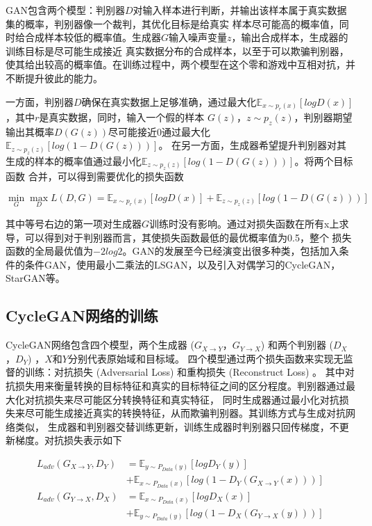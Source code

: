 GAN包含两个模型：判别器$D$对输入样本进行判断，并输出该样本属于真实数据集的概率，判别器像一个裁判，其优化目标是给真实
样本尽可能高的概率值，同时给合成样本较低的概率值。生成器$G$输入噪声变量$z$，输出合成样本，生成器的训练目标是尽可能生成接近
真实数据分布的合成样本，以至于可以欺骗判别器，使其给出较高的概率值。在训练过程中，两个模型在这个零和游戏中互相对抗，并不断提升彼此的能力。

一方面，判别器$D$确保在真实数据上足够准确，通过最大化$\mathbb{E}_{x\sim p_r(x)}\left[log D(x)\right]$，其中$r$是真实数据，同时，输入一个假的样本
$G(z)$，$z\sim p_z(z)$，判别器期望输出其概率$D(G(z))$尽可能接近$0$通过最大化$\mathbb{E}_{z\sim p_z(z)}\left[log(1-D(G(z)))\right]$。
在另一方面，生成器希望提升判别器对其生成的样本的概率值通过最小化$\mathbb{E}_{z\sim p_z(z)}\left[log(1-D(G(z)))\right]$。将两个目标函数
合并，可以得到需要优化的损失函数

\begin{equation}
    \min_G \max_D L(D,G)=\mathbb{E}_{x\sim p_r(x)}\left[log D(x)\right] + \mathbb{E}_{z\sim p_z(z)}\left[log(1-D(G(z)))\right]
\end{equation}

其中等号右边的第一项对生成器$G$训练时没有影响。通过对损失函数在所有x上求导，可以得到对于判别器而言，其使损失函数最低的最优概率值为0.5，整个
损失函数的全局最优值为$-2log2$。GAN的发展至今已经演变出很多种类，包括加入条件的条件GAN，使用最小二乘法的LSGAN，以及引入对偶学习的CycleGAN，StarGAN等。

\subsection{CycleGAN网络的训练}
CycleGAN网络包含四个模型，两个生成器 ($G_{X\rightarrow Y}$，$G_{Y\rightarrow X}$) 和两个判别器 ($D_X$，$D_Y$) ，$X$和$Y$分别代表原始域和目标域。
四个模型通过两个损失函数来实现无监督的训练：对抗损失 (Adversarial Loss) 和重构损失 (Reconstruct Loss) 。
其中对抗损失用来衡量转换的目标特征和真实的目标特征之间的区分程度。判别器通过最大化对抗损失来尽可能区分转换特征和真实特征，
同时生成器通过最小化对抗损失来尽可能生成接近真实的转换特征，从而欺骗判别器。其训练方式与生成对抗网络类似，
生成器和判别器交替训练更新，训练生成器时判别器只回传梯度，不更新梯度。对抗损失表示如下

\begin{align}
    L_{adv}(G_{X\rightarrow Y},D_Y) & =\mathbb{E}_{y\sim P_{Data}(y)}\left[log D_Y(y)\right] \\
    & + \mathbb{E}_{x\sim P_{Data}(x)}\left[log(1-D_Y(G_{X\rightarrow Y}(x)))\right] \\
    L_{adv}(G_{Y\rightarrow X},D_X) & =\mathbb{E}_{x\sim P_{Data}(x)}\left[log D_X(x)\right] \\
    & + \mathbb{E}_{y\sim P_{Data}(y)}\left[log(1-D_X(G_{Y\rightarrow X}(y)))\right] 
\end{align}


